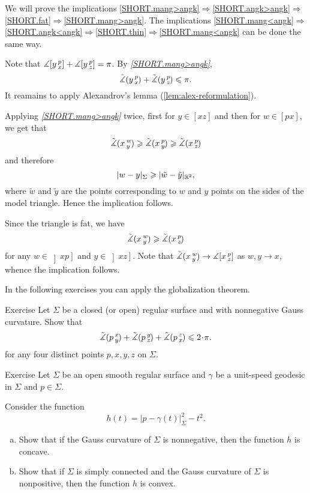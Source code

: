  We will prove the implications \ref{SHORT.mang>angk}$\Rightarrow$\ref{SHORT.angk>angk}$\Rightarrow$\ref{SHORT.fat}$\Rightarrow$\ref{SHORT.mang>angk}.
The implications \ref{SHORT.mang<angk}$\Rightarrow$\ref{SHORT.angk<angk}$\Rightarrow$\ref{SHORT.thin}$\Rightarrow$\ref{SHORT.mang<angk} can be done the same way.

Note that $\measuredangle[y\,{}^{p}_{x}]+\measuredangle[y\,{}^{p}_{z}]=\pi$.
By \textit{\ref{SHORT.mang>angk}}, 
\[\tilde\measuredangle(y\,{}^{p}_{x}\hspace{-0.2ex})+\tilde\measuredangle(y\,{}^{p}_{z}\hspace{-0.2ex})\leqslant \pi.\]
It reamains to apply Alexandrov's lemma (\ref{lem:alex-reformulation}).


Applying \textit{\ref{SHORT.mang>angk}} twice, first for $y\in [xz]$ and then for $w\in [px]$, we get that
\[\tilde\measuredangle(x\,{}^{w}_{y}\hspace{-0.2ex}) \geqslant \tilde\measuredangle(x\,{}^{p}_{y}\hspace{-0.2ex}) \geqslant \tilde\measuredangle(x\,{}^{p}_{z}\hspace{-0.2ex})\]
and therefore
\[|w-y|_\Sigma\geqslant |\tilde w-\tilde y|_{\mathbb{R}^2},\]
where $\tilde w$ and $\tilde y$ are the points corresponding to $w$ and $y$ points on the sides of the model triangle. Hence the implication follows.

Since the triangle is fat, we have 
\[\tilde\measuredangle(x\,{}^{w}_{y}\hspace{-0.2ex}) \geqslant \tilde\measuredangle(x\,{}^{p}_{z}\hspace{-0.2ex})\]
for any $w\in \left]xp\right]$ and $y\in \left]xz\right]$.
Note that $\tilde\measuredangle(x\,{}^{w}_{y}\hspace{-0.2ex})\to \measuredangle[x\,{}^{p}_{z}]$ as $w,y\to x$, whence the implication follows.
\qeds

In the following exercises you can apply the globalization theorem.

\begin{thm}{Exercise}\label{ex:sum=<2pi}
Let $\Sigma$ be a closed (or open) regular surface and with nonnegative Gauss curvature.
Show that 
\[\angk pxy+\angk pyz+\angk pzx\le2\cdot \pi.\]
for any four distinct points $p,x,y,z$ on $\Sigma$.
\end{thm}

\begin{thm}{Exercise}\label{ex:geod-convexity}
Let $\Sigma$ be an open smooth regular surface
and $\gamma$ be a unit-speed geodesic in $\Sigma$ and $p\in\Sigma$.

Consider the function
\[h(t)=|p-\gamma(t)|_\Sigma^2-t^2.\]

\begin{enumerate}[(a)]
\item Show that if the Gauss curvature of $\Sigma$ is nonnegative, then the function $h$ is concave.
\item Show that if $\Sigma$ is simply connected and the Gauss curvature of $\Sigma$ is nonpositive, then the function $h$ is convex.
\end{enumerate}
\end{thm}


